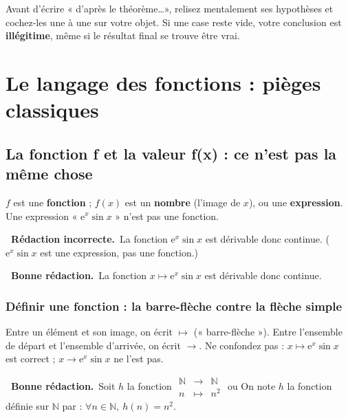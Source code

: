 \documentclass[11pt,a4paper]{article}
\newcommand{\ok}{\textcolor{METeal}{\textbf{\ding{51}\ \sffamily Bonne rédaction.}}\ }
\newcommand{\ko}{\textcolor{MECoral}{\textbf{\ding{55}\ \sffamily Rédaction incorrecte.}}\ }
\newcommand{\N}{\mathbb{N}}
\newcommand{\ra}{\longrightarrow}
\begin{document}
\begin{astuce}
Avant d'écrire « d'après le théorème\dots », relisez mentalement ses hypothèses et
cochez-les une à une sur votre objet. Si une case reste vide, votre conclusion est
\textbf{illégitime}, même si le résultat final se trouve être vrai.
\end{astuce}

\newpage
\section{Le langage des fonctions : pièges classiques}

\subsection{La fonction f et la valeur f(x) : ce n'est pas la même chose}

\begin{attention}
$f$ est une \textbf{fonction} ; $f(x)$ est un \textbf{nombre} (l'image de $x$), ou une
\textbf{expression}. Une expression « $\mathrm e^{x}\sin x$ » n'est pas une fonction.
\end{attention}
\begin{mauvaise}
\ko La fonction $\mathrm e^{x}\sin x$ est dérivable donc continue. \quad($\mathrm e^x\sin x$
est une expression, pas une fonction.)
\end{mauvaise}
\begin{bonne}
\ok La fonction $x\mapsto \mathrm e^{x}\sin x$ est dérivable donc continue.
\end{bonne}

\subsubsection{Définir une fonction : la barre-flèche contre la flèche simple}

\begin{attention}
Entre un élément et son image, on écrit $\mapsto$ (« barre-flèche »). Entre l'ensemble de
départ et l'ensemble d'arrivée, on écrit $\ra$. Ne confondez pas :
$x\mapsto \mathrm e^x\sin x$ est correct ; $x\ra \mathrm e^x\sin x$ ne l'est pas.
\end{attention}
\begin{bonne}
\ok Soit $h$ la fonction $\begin{array}{rcl}\N&\ra&\N\\ n&\mapsto& n^2\end{array}$
\qquad ou \qquad On note $h$ la fonction définie sur $\N$ par : $\forall n\in\N,\ h(n)=n^2.$
\end{bonne}
\end{document}
